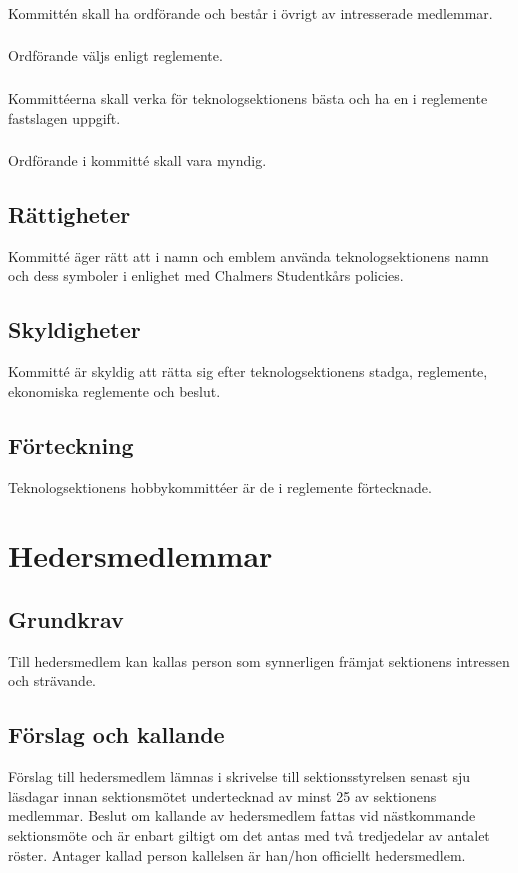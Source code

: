 \documentclass[a4paper]{dtek}
\begin{document}
\subsubsection{}
Kommittén skall ha ordförande och består i övrigt av intresserade medlemmar.
\subsubsection{}
Ordförande väljs enligt reglemente.
\subsubsection{}
Kommittéerna skall verka för teknologsektionens bästa och ha en i reglemente fastslagen uppgift.
\subsubsection{}
Ordförande i kommitté skall vara myndig.
\subsection{Rättigheter}
Kommitté äger rätt att i namn och emblem använda teknologsektionens namn och dess symboler i enlighet med Chalmers Studentkårs policies.
\subsection{Skyldigheter}
Kommitté är skyldig att rätta sig efter teknologsektionens stadga, reglemente, ekonomiska reglemente och beslut.
\subsection{Förteckning}
Teknologsektionens hobbykommittéer är de i reglemente förtecknade.
\newpage

\section{Hedersmedlemmar}
\subsection{Grundkrav}
Till hedersmedlem kan kallas person som synnerligen främjat sektionens intressen och strävande.
\subsection{Förslag och kallande}
Förslag till hedersmedlem lämnas i skrivelse till sektionsstyrelsen senast sju läsdagar innan sektionsmötet undertecknad av minst 25 av sektionens medlemmar. Beslut om kallande av hedersmedlem fattas vid nästkommande sektionsmöte och är enbart giltigt om det antas med två tredjedelar av antalet röster. Antager kallad person kallelsen är han/hon officiellt hedersmedlem.
\newpage
\end{document}
